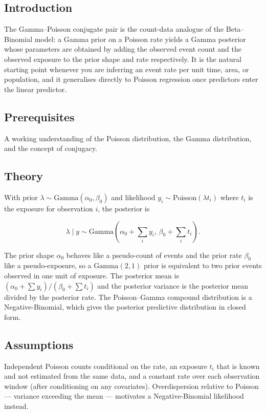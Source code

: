 \documentclass[
]{article}
\author{}
\date{\vspace{-2.5em}}
\begin{document}
\subsection{Introduction}\label{introduction}

The Gamma--Poisson conjugate pair is the count-data analogue of the
Beta--Binomial model: a Gamma prior on a Poisson rate yields a Gamma
posterior whose parameters are obtained by adding the observed event
count and the observed exposure to the prior shape and rate
respectively. It is the natural starting point whenever you are
inferring an event rate per unit time, area, or population, and it
generalises directly to Poisson regression once predictors enter the
linear predictor.

\subsection{Prerequisites}\label{prerequisites}

A working understanding of the Poisson distribution, the Gamma
distribution, and the concept of conjugacy.

\subsection{Theory}\label{theory}

With prior \(\lambda \sim \mathrm{Gamma}(\alpha_0, \beta_0)\) and
likelihood \(y_i \sim \mathrm{Poisson}(\lambda t_i)\) where \(t_i\) is
the exposure for observation \(i\), the posterior is

\[\lambda \mid y \sim \mathrm{Gamma}\!\left(\alpha_0 + \sum_{i} y_i, \, \beta_0 + \sum_{i} t_i\right).\]

The prior shape \(\alpha_0\) behaves like a pseudo-count of events and
the prior rate \(\beta_0\) like a pseudo-exposure, so a
\(\mathrm{Gamma}(2, 1)\) prior is equivalent to two prior events
observed in one unit of exposure. The posterior mean is
\((\alpha_0 + \sum y_i) / (\beta_0 + \sum t_i)\) and the posterior
variance is the posterior mean divided by the posterior rate. The
Poisson--Gamma compound distribution is a Negative-Binomial, which gives
the posterior predictive distribution in closed form.

\subsection{Assumptions}\label{assumptions}

Independent Poisson counts conditional on the rate, an exposure \(t_i\)
that is known and not estimated from the same data, and a constant rate
over each observation window (after conditioning on any covariates).
Overdispersion relative to Poisson --- variance exceeding the mean ---
motivates a Negative-Binomial likelihood instead.
\end{document}
